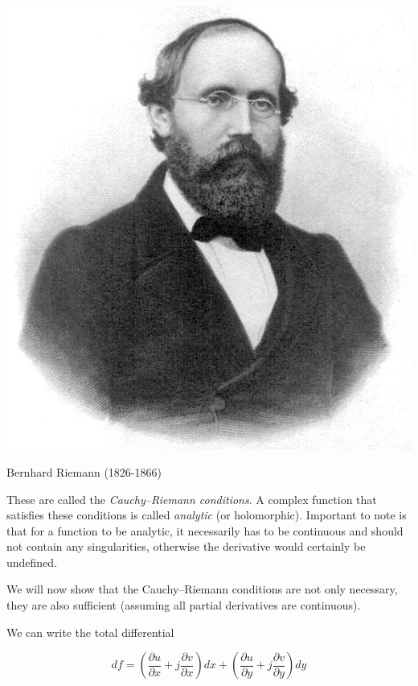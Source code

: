 \begin{marginfigure}[-3.0cm]
  \includegraphics{complex/figures/b_riemann}
  \caption{Bernhard Riemann (1826-1866)}
\end{marginfigure}


These are called the \emph{Cauchy--Riemann conditions}. A complex function that satisfies these conditions is called \emph{analytic} (or holomorphic). Important to note is that for a function to be analytic, it necessarily has to be continuous and should not contain any singularities, otherwise the derivative would certainly be undefined.

We will now show that the Cauchy--Riemann conditions are not only necessary, they are also sufficient (assuming all partial derivatives are continuous).

We can write the total differential

\begin{equation}
d f = \left( \frac{\partial u}{\partial x}+j\frac{\partial v}{\partial x}\right) d x+\left(\frac{\partial u}{\partial y}+j\frac{\partial v}{\partial y}\right) d y
\end{equation} 

